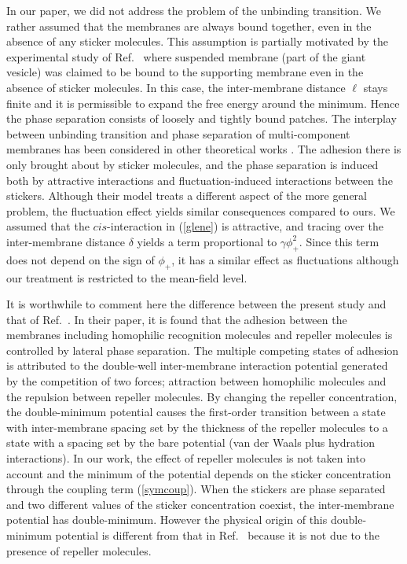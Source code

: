 In our paper, we did not address the problem of the unbinding
transition. We rather assumed that the membranes are always bound
together, even in the absence of any sticker molecules. 
This assumption is partially motivated by the experimental study 
of Ref.\ \cite{BBS} where suspended membrane (part of the giant
vesicle) was claimed to be bound to the supporting membrane even
in the absence of sticker molecules.
In this case, the inter-membrane distance $\ell$ stays finite
and it is permissible to expand the free energy around the minimum.
Hence the phase separation consists of loosely and tightly
bound patches.
The interplay between unbinding transition and phase separation
of multi-component membranes has been considered in other
theoretical works \cite{Lipowsky96,Lipowsky97,WNL}.
The adhesion there is only brought about by sticker molecules, and
the phase separation is induced both by attractive interactions
and fluctuation-induced interactions between the stickers.
Although their model treats a different aspect of the more general
problem, the fluctuation effect yields similar consequences
compared to ours. We assumed that the $cis$-interaction in
(\ref{glene}) is attractive, and tracing over the inter-membrane
distance $\delta$ yields a term proportional to $\gamma \phi_+^2$.
Since this term does not depend on the sign of $\phi_+$, it has a
similar effect as fluctuations although our treatment is
restricted to the mean-field level.


It is worthwhile to comment here the difference between the
present study and that of Ref.\ \cite{BBS}. In their paper, it is
found that the adhesion between the membranes including homophilic
recognition molecules and repeller molecules is controlled by
lateral phase separation. The multiple competing states of
adhesion is attributed to the double-well inter-membrane
interaction potential generated by the competition of two forces;
attraction between homophilic molecules and the repulsion between
repeller molecules. By changing the repeller concentration, the
double-minimum potential causes the first-order transition between
a state with inter-membrane spacing set by the thickness of the
repeller molecules to a state with a spacing set by the bare
potential (van der Waals plus hydration interactions). In our
work, the effect of repeller molecules is not taken into account
and the minimum of the potential depends on the sticker
concentration through the coupling term (\ref{symcoup}). When the
stickers are phase separated and two different values of the
sticker concentration coexist, the inter-membrane potential has
double-minimum. However the physical origin of this double-minimum
potential is different from that in Ref.\ \cite{BBS} because it is
not due to the presence of repeller molecules.


